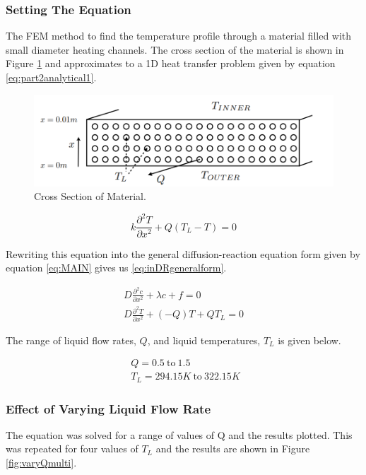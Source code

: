 \documentclass[11pt]{article}
\begin{document}
\subsubsection{Setting The Equation}
The FEM method to find the temperature profile through a material filled with small diameter heating channels. The cross section of the material is shown in Figure \ref{fig:CrossSection} and approximates to a 1D heat transfer problem given by equation \ref{eq:part2analytical1}.

\begin{figure}[h!] 
    \centering
    \includegraphics{CrossSection}
    \caption{Cross Section of Material.}\label{fig:CrossSection}
\end{figure}

\begin{equation} \label{eq:part2analytical1}
k \frac{\partial^2 T}{\partial x^2} + Q(T_L - T) = 0
\end{equation}

Rewriting this equation into the general diffusion-reaction equation form given by equation \ref{eq:MAIN} gives us \ref{eq:inDRgeneralform}.

\begin{subequations}
\begin{align}
D \frac{\partial^2c}{\partial x^2} + \lambda c + f = 0 \label{eq:DRgeneral} \\
D \frac{\partial^2T}{\partial x^2} + (-Q) T + QT_L = 0 \label{eq:inDRgeneralform}
\end{align}
\end{subequations}


The range of liquid flow rates, $Q$, and liquid temperatures, $T_L$ is given below.

\begin{align*}
&Q = 0.5 \ \text{to} \ 1.5  \\
&T_L = 294.15K \ \text{to}\ 322.15K \ \ 
\end{align*}
\clearpage
\subsubsection{Effect of Varying Liquid Flow Rate}
The equation was solved for a range of values of Q and the results plotted. This was repeated for four values of $T_L$ and the results are shown in Figure \ref{fig:varyQmulti}. 
\end{document}
